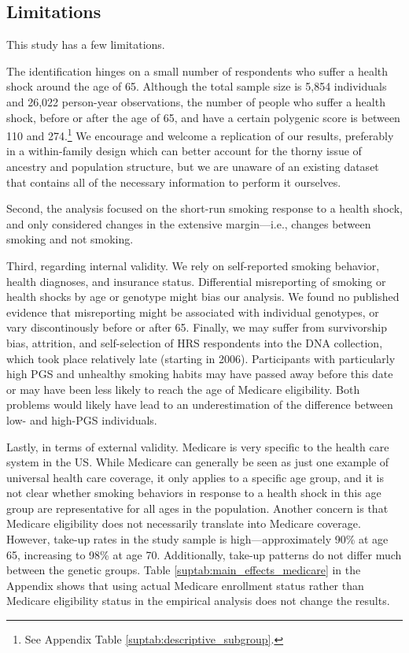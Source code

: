 \documentclass[11pt]{article}
\begin{document}
\subsection{Limitations}\label{sec:limitations}
This study has a few limitations.

The identification hinges on a small number of respondents who suffer a health shock around the age of 65. Although the total sample size is 5,854 individuals and 26,022 person-year observations, the number of people who suffer a health shock, before or after the age of 65, and have a certain polygenic score is between 110 and 274.\footnote{See Appendix Table \ref{suptab:descriptive_subgroup}.}
We encourage and welcome a replication of our results, preferably in a within-family design which can better account for the thorny issue of ancestry and population structure, but we are unaware of an existing dataset that contains all of the necessary information to perform it ourselves.

Second, the analysis focused on the short-run smoking response to a health shock, and only considered changes in the extensive margin---i.e., changes between smoking and not smoking.

Third, regarding internal validity.
We rely on self-reported smoking behavior, health diagnoses, and insurance status.
Differential misreporting of smoking or health shocks by age or genotype might bias our analysis.
We found no published evidence that misreporting might be associated with individual genotypes, or vary discontinously before or after 65.
Finally, we may suffer from survivorship bias, attrition, and self-selection of HRS respondents into the DNA collection, which took place relatively late (starting in 2006). Participants with particularly high PGS and unhealthy smoking habits may have passed away before this date or may have been less likely to reach the age of Medicare eligibility.
Both problems would likely have lead to an underestimation of the difference between low- and high-PGS individuals.

Lastly, in terms of external validity.
Medicare is very specific to the health care system in the US.
While Medicare can generally be seen as just one example of universal health care coverage, it only applies to a specific age group, and it is not clear whether smoking behaviors in response to a health shock in this age group are representative for all ages in the population.
Another concern is that Medicare eligibility does not necessarily translate into Medicare coverage.
However, take-up rates in the study sample is high---approximately 90\% at age 65, increasing to 98\% at age 70.
Additionally, take-up patterns do not differ much between the genetic groups.
Table \ref{suptab:main_effects_medicare} in the Appendix shows that using actual Medicare enrollment status rather than Medicare eligibility status in the empirical analysis does not change the results.
\end{document}

